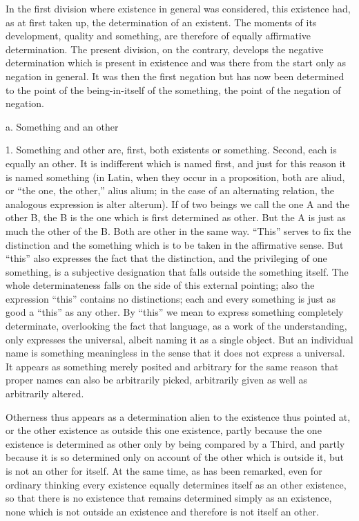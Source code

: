 In the first division where existence in general was considered,
this existence had, as at first taken up, the determination of an existent.
The moments of its development, quality and something,
are therefore of equally affirmative determination.
The present division, on the contrary, develops
the negative determination which is present in existence
and was there from the start only as negation in general.
It was then the first negation but has now been determined to
the point of the being-in-itself of the something,
the point of the negation of negation.

a. Something and an other

1. Something and other are,
first, both existents or something.
Second, each is equally an other.
It is indifferent which is named first,
and just for this reason it is named something
(in Latin, when they occur in a proposition,
both are aliud, or “the one, the other,” alius alium;
in the case of an alternating relation,
the analogous expression is alter alterum).
If of two beings we call the one A and the other B,
the B is the one which is first determined as other.
But the A is just as much the other of the B.
Both are other in the same way.
“This” serves to fix the distinction
and the something which is to be taken in the affirmative sense.
But “this” also expresses the fact that the distinction,
and the privileging of one something,
is a subjective designation that falls outside the something itself.
The whole determinateness falls on the side of this external pointing;
also the expression “this” contains no distinctions;
each and every something is just as good a “this” as any other.
By “this” we mean to express something completely determinate,
overlooking the fact that language, as a work of the understanding,
only expresses the universal, albeit naming it as a single object.
But an individual name is something meaningless in the sense
that it does not express a universal.
It appears as something merely posited
and arbitrary for the same reason
that proper names can also be arbitrarily picked,
arbitrarily given as well as arbitrarily altered.

Otherness thus appears as a determination
alien to the existence thus pointed at,
or the other existence as outside this one existence,
partly because the one existence is determined as other
only by being compared by a Third,
and partly because it is so determined
only on account of the other which is outside it,
but is not an other for itself.
At the same time, as has been remarked,
even for ordinary thinking every existence
equally determines itself as an other existence,
so that there is no existence
that remains determined simply as an existence,
none which is not outside an existence
and therefore is not itself an other.

